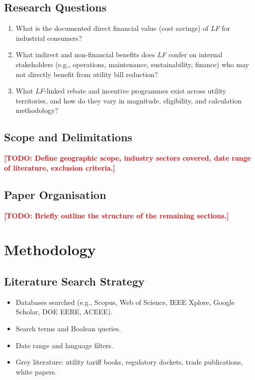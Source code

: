 \documentclass[12pt, a4paper, twocolumn]{article}
\newcommand{\LF}{\textit{LF}}
\newcommand{\TODO}[1]{\textcolor{red}{\textbf{[TODO: #1]}}}
\begin{document}
\subsection{Research Questions}
\begin{enumerate}[nosep]
  \item What is the documented direct financial value (cost savings) of \LF{} for industrial consumers?
  \item What indirect and non-financial benefits does \LF{} confer on internal stakeholders (e.g., operations, maintenance, sustainability, finance) who may not directly benefit from utility bill reduction?
  \item What \LF{}-linked rebate and incentive programmes exist across utility territories, and how do they vary in magnitude, eligibility, and calculation methodology?
\end{enumerate}

\subsection{Scope and Delimitations}
\TODO{Define geographic scope, industry sectors covered, date range of literature, exclusion criteria.}

\subsection{Paper Organisation}
\TODO{Briefly outline the structure of the remaining sections.}


\section{Methodology}
\label{sec:methodology}

\subsection{Literature Search Strategy}
\begin{itemize}[nosep]
  \item Databases searched (e.g., Scopus, Web of Science, IEEE Xplore, Google Scholar, DOE EERE, ACEEE).
  \item Search terms and Boolean queries.
  \item Date range and language filters.
  \item Grey literature: utility tariff books, regulatory dockets, trade publications, white papers.
\end{itemize}
\end{document}
